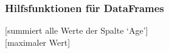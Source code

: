 \subsubsection{Hilfsfunktionen für DataFrames}\label{sec:08-hilfsfunktionen-für-dataframes}
\begin{contentbox}
[summiert alle Werte der Spalte `Age']\\
[maximaler Wert]
\end{contentbox}






